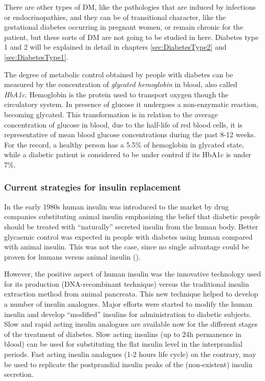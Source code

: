 There are other types of DM, like the pathologies that are induced by infections or endocrinopathies, and they can be of transitional character, like the gestational diabetes occurring in pregnant women, or remain chronic for the patient, but these sorts of DM are not going to be studied in here. Diabetes type 1 and 2 will be explained in detail in chapters \ref{sec:DiabetesType2} and \ref{sec:DiabetesType1}.

The degree of metabolic control obtained by people with diabetes can be measured by the concentration of \textit{glycated hemoglobin} in blood, also called \textit{HbA1c}. Hemoglobin is the protein used to transport oxygen though the circulatory system. In presence of glucose it undergoes a non-enzymatic reaction, becoming glycated. This transformation is in relation to the average concentration of glucose in blood, due to the half-life of red blood cells, it is representative of mean blood glucose concentrations during the past 8-12 weeks. For the record, a healthy person has a 5.5\% of hemoglobin in glycated state, while a diabetic patient is considered to be under control if its HbA1c is under 7\%.

\subsubsection{Current strategies for insulin replacement}
\label{sec:CurrentStrategiesForInsulinReplacement}

In the early 1980s human insulin was introduced to the market by drug companies substituting animal insulin emphasizing the belief that diabetic people should be treated with ``naturally'' secreted insulin from the human body. Better glycaemic control was expected in people with diabetes using human compared with animal insulin. This was not the case, since no single advantage could be proven for humans versus animal insulin (\cite{sonnenberg1983human}).

However, the positive aspect of human insulin was the innovative technology used for its production (DNA-recombinant technique) versus the traditional insulin extraction method from animal pancreata. This new technique helped to develop a number of insulin analogues. Major efforts were started to modify the human insulin and develop ``modified'' insulins for administration to diabetic subjects. Slow and rapid acting insulin analogues are available now for the different stages of the treatment of diabetes. Slow acting insulins (up to 24h permanence in blood) can be used for substituting the flat insulin level in the interprandial periods. Fast acting insulin analogues (1-2 hours life cycle) on the contrary, may be used to replicate the postprandial insulin peaks of the (non-existent) insulin secretion.

